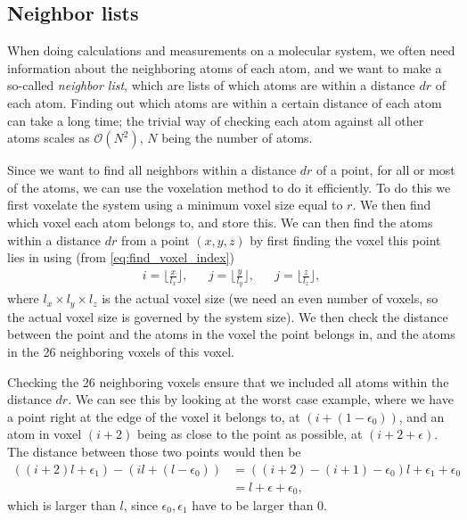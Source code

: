 \subsection{Neighbor lists\label{sec:neighbor_lists}}
When doing calculations and measurements on a molecular system, we often need information about the neighboring atoms of each atom, and we want to make a so-called \emph{neighbor list}, which are lists of which atoms are within a distance $dr$ of each atom. Finding out which atoms are within a certain distance of each atom can take a long time; the trivial way of checking each atom against all other atoms scales as $\mathcal{O}(N^2)$, $N$ being the number of atoms. 
%

Since we want to find all neighbors within a distance $dr$ of a point, for all or most of the atoms, we can use the voxelation method to do it efficiently. To do this we first voxelate the system using a minimum voxel size equal to $r$. We then find which voxel each atom belongs to, and store this. We can then find the atoms within a distance $dr$ from a point $(x,y,z)$ by first finding the voxel this point lies in using (from \cref{eq:find_voxel_index})
\begin{align*}
    &i = \Bigg\lfloor \frac{x}{l_x} \Bigg\rfloor,& &j = \Bigg\lfloor \frac{y}{l_y} \Bigg\rfloor,& &j = \Bigg\lfloor \frac{z}{l_z} \Bigg\rfloor,&
\end{align*}
where $l_x\times l_y \times l_z$ is the actual voxel size (we need an even number of voxels, so the actual voxel size is governed by the system size). We then check the distance between the point and the atoms in the voxel the point belongs in, and the atoms in the 26 neighboring voxels of this voxel. 
%

Checking the 26 neighboring voxels ensure that we included all atoms within the distance $dr$. We can see this by looking at the worst case example, where we have a point right at the edge of the voxel it belongs to, at $(i+(1-\epsilon_0))$, and an atom in voxel $(i+2)$ being as close to the point as possible, at $(i+2 + \epsilon)$. The distance between those two points would then be
\begin{align*}
    ((i+2)l + \epsilon_1) - (il + (l-\epsilon_0)) 
    &= ((i + 2) - (i + 1) - \epsilon_0)l + \epsilon_1 + \epsilon_0 \\
    &= l + \epsilon + \epsilon_0,
\end{align*}
which is larger than $l$, since $\epsilon_0, \epsilon_1$ have to be larger than 0.

